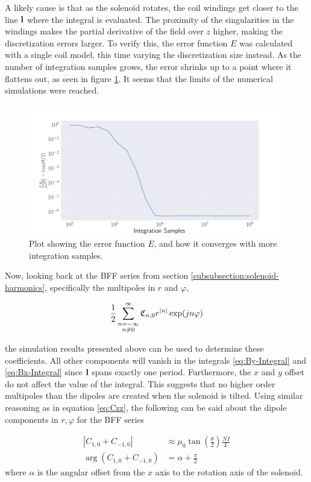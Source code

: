 A likely cause is that as the solenoid rotates, the coil windings 
get closer to the line $\vb{l}$ where the integral is evaluated. The 
proximity of the singularities in the windings makes the partial derivative
of the field over $z$ higher, making the discretization errors larger.
To verify this, the error function $E$ was calculated with a single coil
model, this time varying the discretization size instead. As the number
of integration samples grows, the error shrinks up to a point where it  
flattens out, as seen in figure \ref{fig:ByInt-Error-convergence}. It seems
that the limits of the numerical simulations were reached.

\begin{figure}[h!]
    \centering
    \includegraphics[width=\linewidth]{figs/ByInt-Convergence.png}
    \caption{Plot showing the error function $E$, and how it converges with
    more integration samples.}
    \label{fig:ByInt-Error-convergence}
\end{figure}

Now, looking back at the BFF series from section
\ref{subsubsection:solenoid-harmonics}, specifically the
multipoles in $r$ and $\varphi$, 

\begin{equation}
    \frac{1}{2} \sum\limits_{\substack{n=-\infty\\n\neq 0}}^\infty \mathfrak{C}_{n,0} r^{|n|}\exp(jn\varphi)
\end{equation}

the simulation results presented above can be used to determine
these coefficients. All other components will vanish in the
integrals \ref{eq:By-Integral} and \ref{eq:Bx-Integral} since
$\vb{l}$ spans exactly one period. Furthermore, the
$x$ and $y$ offset do not affect the value of the integral.
This suggests that no higher order multipoles than the dipoles are
created when the solenoid is tilted. Using similar reasoning as 
in equation \ref{eq:Czz}, the following can be said about the 
dipole components in $r, \varphi$ for the BFF series

\begin{align}
    |C_{1,0} + C_{-1,0}| &\approx \mu_0
    \tan\left( \frac{\theta}{2} \right) \frac{NI}{L} \\
    \arg(C_{1,0} + C_{-1,0}) &= \alpha + \frac{\pi}{2}
\end{align}
where $\alpha$ is the angular offset from the $x$ axis to the rotation
axis of the solenoid.
